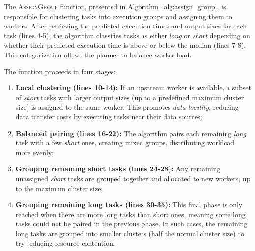 The \textsc{AssignGroup} function, presented in Algorithm~\ref{alg:assign_group}, is responsible for clustering tasks into execution groups and assigning them to workers. After retrieving the predicted execution times and output sizes for each task (lines 4-5), the algorithm classifies tasks as either \textit{long} or \textit{short} depending on whether their predicted execution time is above or below the median (lines 7-8). This categorization allows the planner to balance worker load.

The function proceeds in four stages:
\begin{enumerate}
    \item \textbf{Local clustering (lines 10-14):} If an upstream worker is available, a subset of \textit{short} tasks with larger output sizes (up to a predefined maximum cluster size) is assigned to the same worker. This promotes \textit{data locality}, reducing data transfer costs by executing tasks near their data sources;
    
    \item \textbf{Balanced pairing (lines 16-22):} The algorithm pairs each remaining \textit{long} task with a few \textit{short} ones, creating mixed groups, distributing workload more evenly;
    
    \item \textbf{Grouping remaining short tasks (lines 24-28):} Any remaining unassigned \textit{short} tasks are grouped together and allocated to new workers, up to the maximum cluster size;
    
    \item \textbf{Grouping remaining long tasks (lines 30-35):} This final phase is only reached when there are more long tasks than short ones, meaning some long tasks could not be paired in the previous phase. In such cases, the remaining long tasks are grouped into smaller clusters (half the normal cluster size) to try reducing resource contention.
\end{enumerate}

